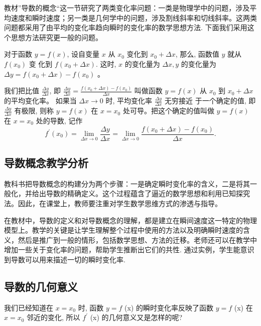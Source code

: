 教材”导数的概念“这一节研究了两类变化率问题：一类是物理学中的问题，涉及平均速度和瞬时速度；另一类是几何学中的问题，涉及割线斜率和切线斜率。这两类问题都采用了由平均的变化率趋向瞬时的变化率的数学思想方法. 下面我们采用这个思想方法研究更一般的问题\cite{章建跃选择性必修二}。

对于函数 ${y}={f}({x})$, 设自变量 ${x}$ 从 ${x}_{0}$ 变化到 ${x}_{0}+\Delta {x}$, 那么, 函数值 ${y}$ 就从 ${f}\left({x}_{0}\right)$ 变 化到 ${f}\left({x}_{0}+\Delta {x}\right)$. 这时, ${x}$ 的变化量为 $\Delta {x}, {y}$ 的变化量为 $\Delta y=f\left(x_{0}+\Delta x\right)-f\left(x_{0}\right)$ \cite{章建跃选择性必修二}。

我们把比值 $\frac{\Delta {y}}{\Delta {x}}$, 即 $\frac{\Delta {y}}{\Delta x}=\frac{f\left(x_{0}+\Delta x\right)-f\left(x_{0}\right)}{\Delta x}$ 叫做函数 ${y}={f}({x})$ 从 ${x}_{0}$ 到 ${x}_{0}+\Delta {x}$ 的平均变化率。
如果当 $\Delta x \rightarrow 0$ 时, 平均变化率 $\frac{\Delta {y}}{\Delta {x}}$ 无穷接近 于一个确定的值, 即 $\frac{\Delta {y}}{\Delta {x}}$ 有极限, 则称 ${y}={f}({x})$ 在 ${x}={x}_{0}$ 处可导。把这个确定的值叫做 ${y}={f}({x})$ 在 ${x}={x}_{0}$ 处的导数, 记作
\[
f^{\prime}\left({x}_{0}\right)=\lim _{\Delta x \rightarrow 0} \frac{\Delta y}{\Delta x}=\lim _{\Delta x \rightarrow 0} \frac{f\left(x_{0}+\Delta x\right)-f\left(x_{0}\right)}{\Delta x}.
\]


\subsection{导数概念教学分析}

教科书把导数概念的构建分为两个步骤：一是确定瞬时变化率的含义，二是将其一般化，并给出导数的精确定义。这个过程蕴含了逼近的数学思想和利用已知探究法。因此，在课堂上，教师要注重对学生数学思维方式的渗透与指导。

在教材中，导数的定义和对导数概念的理解，都是建立在瞬间速度这一特定的物理模型上。教学的关键是让学生理解整个过程中使用的方法以及明确瞬时速度的含义，然后是推广到一般的情形，包括数学思想、方法的迁移。老师还可以在教学中增加一些关于变化率的问题，帮助学生推断出它们的共性. 通过实例，学生能意识到导数可以用来描述一切的瞬时变化率\cite{闫伟2015高中数学}.


\subsection{导数的几何意义}

我们已经知道在 ${x}={x}_{0}$ 时, 函数 ${y}={f}$
(x) 的瞬时变化率反映了函数 ${y}={f}$
(x) 在 $x=x_{0}$ 邻近的变化, 所以 ${f}^{\prime}$ (x) 的几何意义又是怎样的呢?

